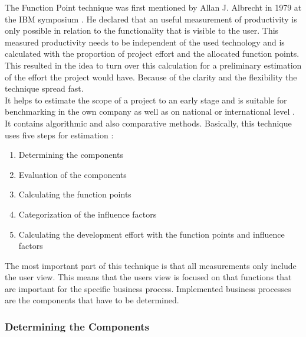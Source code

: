 The Function Point technique was first mentioned by Allan J. Albrecht in 1979 at the IBM symposium \cite{albrecht}. He declared that an useful measurement of productivity is only possible in relation to the functionality that is visible to the user. This measured productivity needs to be independent of the used technology and is calculated with the proportion of project effort and the allocated function points.\\
This resulted in the idea to turn over this calculation for a preliminary estimation of the effort the project would have. Because of the clarity and the flexibility the technique spread fast. \\
It helps to estimate the scope of a project to an early stage and is suitable for benchmarking in the own company as well as on national or international level \cite{FPKompakt}. It contains algorithmic and also comparative methods. Basically, this technique uses five steps for estimation \cite{jenny}:
\begin{enumerate}
	\item Determining the components
	\item Evaluation of the components
	\item Calculating the function points
	\item Categorization of the influence factors
	\item Calculating the development effort with the function points and influence factors
\end{enumerate}
The most important part of this technique is that all measurements only include the user view. This means that the users view is focused on that functions that are important for the specific business process. Implemented business processes are the components that have to be determined.

\subsubsection{Determining the Components}\label{fpcomponents}

